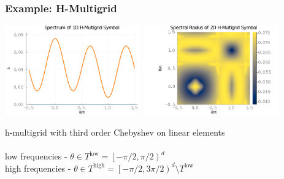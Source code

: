 \documentclass{beamer}
\begin{document}

\begin{frame}
\begin{center}
\frametitle{Example: H-Multigrid}

\includegraphics[height=3.9cm]{../img/hmultigridSymbol1D}
\includegraphics[height=3.9cm]{../img/hmultigridSymbol2D}

h-multigrid with third order Chebyshev on linear elements\\

~\\

low frequencies - $\theta \in T^{\text{low}} = \left[ - \pi / 2, \pi / 2 \right)^d$\\

high frequencies - $\theta \in T^{\text{high}} = \left[ - \pi / 2, 3 \pi / 2 \right)^d \setminus T^{\text{low}}$

\end{center}
\end{frame}

\end{document}
